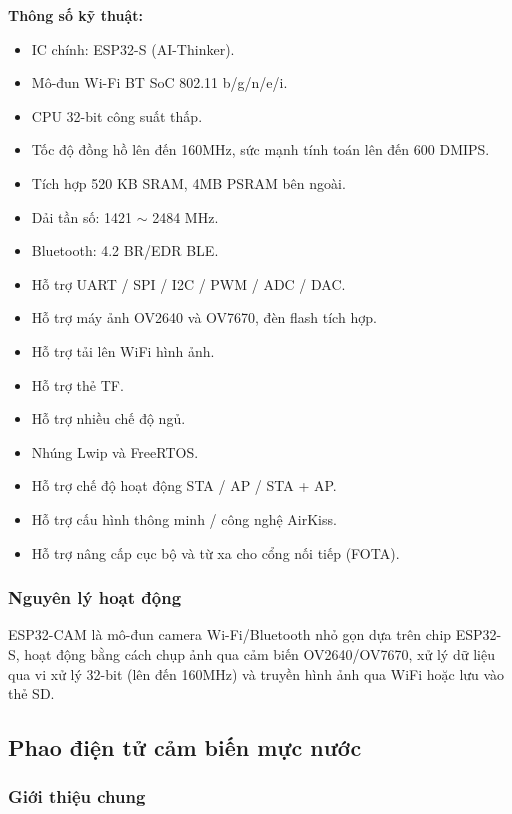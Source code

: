 \documentclass[12pt,a4paper]{report}
\begin{document}
\textbf{Thông số kỹ thuật:}
\begin{itemize}
    \item IC chính: ESP32-S (AI-Thinker).
    \item Mô-đun Wi-Fi BT SoC 802.11 b/g/n/e/i.
    \item CPU 32-bit công suất thấp.
    \item Tốc độ đồng hồ lên đến 160MHz, sức mạnh tính toán lên đến 600 DMIPS.
    \item Tích hợp 520 KB SRAM, 4MB PSRAM bên ngoài.
    \item Dải tần số: 1421 $\sim$ 2484 MHz.
    \item Bluetooth: 4.2 BR/EDR BLE.
    \item Hỗ trợ UART / SPI / I2C / PWM / ADC / DAC.
    \item Hỗ trợ máy ảnh OV2640 và OV7670, đèn flash tích hợp.
    \item Hỗ trợ tải lên WiFi hình ảnh.
    \item Hỗ trợ thẻ TF.
    \item Hỗ trợ nhiều chế độ ngủ.
    \item Nhúng Lwip và FreeRTOS.
    \item Hỗ trợ chế độ hoạt động STA / AP / STA + AP.
    \item Hỗ trợ cấu hình thông minh / công nghệ AirKiss.
    \item Hỗ trợ nâng cấp cục bộ và từ xa cho cổng nối tiếp (FOTA).
\end{itemize}

\subsubsection{Nguyên lý hoạt động}

ESP32-CAM là mô-đun camera Wi-Fi/Bluetooth nhỏ gọn dựa trên chip ESP32-S, hoạt
động bằng cách chụp ảnh qua cảm biến OV2640/OV7670, xử lý dữ liệu qua vi xử
lý 32-bit (lên đến 160MHz) và truyền hình ảnh qua WiFi hoặc lưu vào thẻ SD.

\subsection{Phao điện tử cảm biến mực nước}

\subsubsection{Giới thiệu chung}
\end{document}
